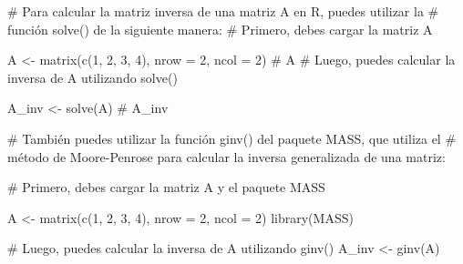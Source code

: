 \documentclass[
  letterpaper,
  DIV=11,
  numbers=noendperiod]{scrreprt}
\newenvironment{Shaded}{}{}
\newcommand{\AttributeTok}[1]{\textcolor[rgb]{0.84,0.23,0.29}{#1}}
\newcommand{\CommentTok}[1]{\textcolor[rgb]{0.42,0.45,0.49}{#1}}
\newcommand{\DecValTok}[1]{\textcolor[rgb]{0.00,0.36,0.77}{#1}}
\newcommand{\FunctionTok}[1]{\textcolor[rgb]{0.44,0.26,0.76}{#1}}
\newcommand{\NormalTok}[1]{\textcolor[rgb]{0.14,0.16,0.18}{#1}}
\newcommand{\OtherTok}[1]{\textcolor[rgb]{0.44,0.26,0.76}{#1}}
\theoremstyle{definition}
\theoremstyle{definition}
\theoremstyle{remark}
\begin{document}
\begin{Shaded}
\begin{Highlighting}[]
\CommentTok{\# Para calcular la matriz inversa de una matriz A en R, puedes utilizar la }
\CommentTok{\# función solve() de la siguiente manera:}
\CommentTok{\# Primero, debes cargar la matriz A}

\NormalTok{A }\OtherTok{\textless{}{-}} \FunctionTok{matrix}\NormalTok{(}\FunctionTok{c}\NormalTok{(}\DecValTok{1}\NormalTok{, }\DecValTok{2}\NormalTok{, }\DecValTok{3}\NormalTok{, }\DecValTok{4}\NormalTok{), }\AttributeTok{nrow =} \DecValTok{2}\NormalTok{, }\AttributeTok{ncol =} \DecValTok{2}\NormalTok{)}
\CommentTok{\# A}
\CommentTok{\# Luego, puedes calcular la inversa de A utilizando solve()}

\NormalTok{A\_inv }\OtherTok{\textless{}{-}} \FunctionTok{solve}\NormalTok{(A)}
\CommentTok{\# A\_inv}

\CommentTok{\# También puedes utilizar la función ginv() del paquete MASS, que utiliza el }
\CommentTok{\# método de Moore{-}Penrose para calcular la inversa generalizada de una matriz:}

\CommentTok{\# Primero, debes cargar la matriz A y el paquete MASS}

\NormalTok{A }\OtherTok{\textless{}{-}} \FunctionTok{matrix}\NormalTok{(}\FunctionTok{c}\NormalTok{(}\DecValTok{1}\NormalTok{, }\DecValTok{2}\NormalTok{, }\DecValTok{3}\NormalTok{, }\DecValTok{4}\NormalTok{), }\AttributeTok{nrow =} \DecValTok{2}\NormalTok{, }\AttributeTok{ncol =} \DecValTok{2}\NormalTok{)}
\FunctionTok{library}\NormalTok{(MASS)}

\CommentTok{\# Luego, puedes calcular la inversa de A utilizando ginv()}
\NormalTok{A\_inv }\OtherTok{\textless{}{-}} \FunctionTok{ginv}\NormalTok{(A)}
\end{Highlighting}
\end{Shaded}
\end{document}

